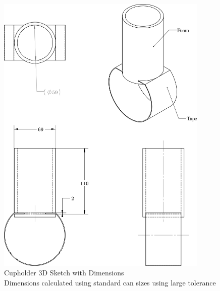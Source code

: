 \documentclass[12pt]{report}
\begin{document}
\begin{figure}[H]
    \centering
    \label{fig:cupholder-solid}
    \includegraphics[width=0.9\textwidth]{cupholder-solid}
    \caption[Cupholder 3D Sketch with Dimensions]{Cupholder 3D Sketch with Dimensions \\ Dimensions calculated using
    standard can sizes\cite{dimen-cansize} using large tolerance}
\end{figure}


\printbibliography
{}
\end{document}
